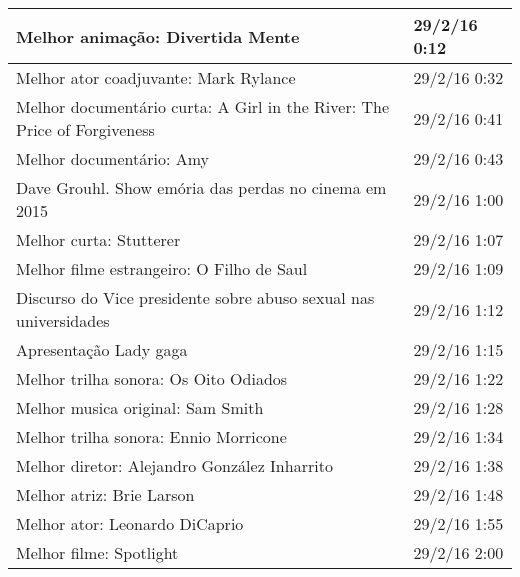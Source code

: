 \begin{table}[H]
\begin{tabular}{|l|l|}
		Melhor anima\c{c}\~{a}o: Divertida Mente                                                   & 29/2/16 0:12              \\ \hline
		Melhor ator coadjuvante: Mark Rylance                                              & 29/2/16 0:32              \\ \hline
		Melhor document\'{a}rio curta: A Girl in the River: The Price of Forgiveness           & 29/2/16 0:41              \\ \hline
		Melhor document\'{a}rio: Amy                                                           & 29/2/16 0:43              \\ \hline
		Dave Grouhl. Show em\'{o}ria das perdas no cinema em 2015 & 29/2/16 1:00              \\ \hline
		Melhor curta: Stutterer                                                            & 29/2/16 1:07              \\ \hline
		Melhor filme estrangeiro: O Filho de Saul                                          & 29/2/16 1:09              \\ \hline
		Discurso do Vice presidente sobre abuso sexual nas universidades                   & 29/2/16 1:12              \\ \hline
		Apresenta\c{c}\~{a}o Lady gaga                                                             & 29/2/16 1:15              \\ \hline
		Melhor trilha sonora: Os Oito Odiados                                              & 29/2/16 1:22              \\ \hline
		Melhor musica original: Sam Smith                                                  & 29/2/16 1:28              \\ \hline
		Melhor trilha sonora: Ennio Morricone                                              & 29/2/16 1:34              \\ \hline
		Melhor diretor: Alejandro Gonz\'{a}lez Inharrito                                       & 29/2/16 1:38              \\ \hline
		Melhor atriz: Brie Larson                                                          & 29/2/16 1:48              \\ \hline
		Melhor ator: Leonardo DiCaprio                                                     & 29/2/16 1:55              \\ \hline
		Melhor filme: Spotlight                                                            & 29/2/16 2:00              \\ \hline
	\end{tabular}
\end{table}

